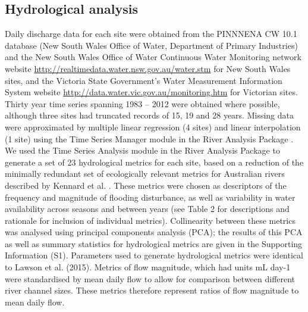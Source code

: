 \documentclass[openright,12pt,a4paper]{memoir}
\begin{document}
\subsection{Hydrological analysis}
Daily discharge data for each site were obtained from the PINNNENA CW 10.1 database (New South Wales Office of Water, Department of Primary Industries) and the New South Wales Office of Water Continuous Water Monitoring network website \url{http://realtimedata.water.nsw.gov.au/water.stm} for New South Wales sites, and the Victoria State Government’s Water Measurement Information System website \url{http://data.water.vic.gov.au/monitoring.htm} for Victorian sites.  Thirty year time series spanning 1983 – 2012 were obtained where possible, although three sites had truncated records of 15, 19 and 28 years. Missing data were approximated by multiple linear regression (4 sites) and linear interpolation (1 site) using the Time Series Manager module in the River Analysis Package \cite{marsh2003river}.  We used the Time Series Analysis module in the River Analysis Package to generate a set of 23 hydrological metrics for each site, based on a reduction of the minimally redundant set of ecologically relevant metrics for Australian rivers described by Kennard et al. \cite{Kennard2010}. These metrics were chosen as descriptors of the frequency and magnitude of flooding disturbance, as well as variability in water availability across seasons and between years (see Table 2 for descriptions and rationale for inclusion of individual metrics). Collinearity between these metrics was analysed using principal components analysis (PCA); the results of this PCA as well as summary statistics for hydrological metrics are given in the Supporting Information (S1). Parameters used to generate hydrological metrics were identical to Lawson et al. (2015). Metrics of flow magnitude, which had units mL day-1 were standardised by mean daily flow to allow for comparison between different river channel sizes. These metrics therefore represent ratios of flow magnitude to mean daily flow.
\end{document}
